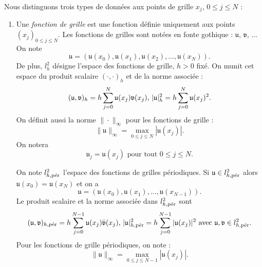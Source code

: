 Nous distinguons trois types de données aux points de grille $x_j$, $0 \leq j \leq N$ :
\begin{enumerate}
\item Une \textit{fonction de grille} est une fonction définie uniquement aux points $(x_j)_{0 \leq j \leq N}$. Les fonctions de grilles sont notées en fonte gothique : $\mathfrak{u}$, $\mathfrak{v}$, ... 
On note
\begin{equation}
\mathfrak{u} = (\mathfrak{u}(x_0), \mathfrak{u}(x_1), \mathfrak{u}(x_2), ... , \mathfrak{u}(x_N)).
\end{equation}
De plus, $l^2_h$ désigne l'espace des fonctions de grille, $h>0$ fixé.
On munit cet espace du produit scalaire $(\cdot, \cdot)_{h}$ et de la norme associée :
\begin{equation}
(\mathfrak{u},\mathfrak{v})_h = h \gsum_{j=0}^N \mathfrak{u}(x_j) \mathfrak{v}(x_j) \text{,  } |\mathfrak{u}|_h^2 = h \gsum_{j=0}^N \mathfrak{u}(x_j)^2.
\end{equation}
On définit aussi la norme $\| \cdot \|_{\infty}$ pour les fonctions de grille :
\begin{equation}
\| \mathfrak{u} \|_{\infty} = \max_{0\leq j \leq N} |\mathfrak{u}(x_j)|.
\end{equation}
On notera 
\begin{equation}
\mathfrak{u}_j = \mathfrak{u}(x_j) \text{ pour tout } 0\leq j \leq N.  
\end{equation}

On note $l^2_{h,\per}$ l'espace des fonctions de grilles périodiques. Si $\mathfrak{u} \in l^2_{h,\per}$ alors $\mathfrak{u}(x_0) = \mathfrak{u}(x_N)$ et on a
\begin{equation}
\mathfrak{u}=(\mathfrak{u}(x_0), \mathfrak{u}(x_1), ..., \mathfrak{u}(x_{N-1})).
\end{equation}
Le produit scalaire et la norme associée dans $l^2_{h,\per}$ sont
\begin{equation}
(\mathfrak{u},\mathfrak{v})_{h,\per} = h \gsum_{j=0}^{N-1} \mathfrak{u}(x_j) \bar{\mathfrak{v}}(x_j) \text{,  } |\mathfrak{u}|_{h,\per}^2 = h \gsum_{j=0}^{N-1} |\mathfrak{u}(x_j)|^2 \text{ avec } \mathfrak{u}, \mathfrak{v} \in l^2_{h,\per}.
\end{equation}
Pour les fonctions de grille périodiques, on note :
\begin{equation}
\| \mathfrak{u} \|_{\infty} = \max_{0\leq j \leq N-1} |\mathfrak{u}(x_j)|.
\end{equation}




\end{enumerate}
